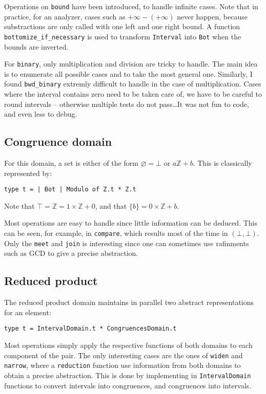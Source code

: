 \documentclass[12pt,a4paper]{article}
\begin{document}
Operations on \texttt{bound} have been introduced, to handle infinite cases. Note that in practice, for an analyzer, cases such as $+\infty - (+\infty)$ never happen, because substractions are only called with one left and one right bound.
A function \texttt{bottomize\_if\_necessary} is used to transform \texttt{Interval} into \texttt{Bot} when the bounds are inverted.

For \texttt{binary}, only multiplication and division are tricky to handle. The main idea is to enumerate all possible cases and to take the most general one. Similarly, I found \texttt{bwd\_binary} extremly difficult to handle in the case of multiplication. Cases where the interval contains zero need to be taken care of, we have to be careful to round intervals -- otherwise multiple tests do not pass\dots It was not fun to code, and even less to debug.

\subsection{Congruence domain}
For this domain, a set is either of the form $\varnothing=\bot$ or $a\mathbb{Z}+b$. This is classically represented by:
\begin{center}
    \texttt{type t = | Bot | Modulo of Z.t * Z.t}
\end{center}
Note that $\top=\mathbb{Z}=1\times\mathbb{Z}+0$, and that $\{b\}=0\times\mathbb{Z}+b$.

Most operations are easy to handle since little information can be deduced. This can be seen, for example, in \texttt{compare}, which results most of the time in $(\bot, \bot)$. Only the \texttt{meet} and \texttt{join} is interesting since one can sometimes use rafinments such as GCD to give a precise abstraction.

\subsection{Reduced product}
The reduced product domain maintains in parallel two abstract representations for an element:
\begin{center}
    \texttt{type t = IntervalDomain.t * CongruencesDomain.t}
\end{center}
Most operations simply apply the respective functions of both domains to each component of the pair. The only interesting cases are the ones of \texttt{widen} and \texttt{narrow}, where a \texttt{reduction} function use information from both domains to obtain a precise abstraction. This is done by implementing in \texttt{IntervalDomain} functions to convert intervals into congruences, and congruences into intervals.
\end{document}
